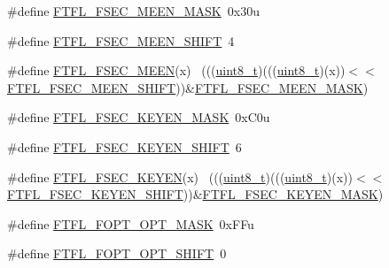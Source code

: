 \begin{DoxyCompactItemize}
\item 
\#define \hyperlink{group___f_t_f_l___register___masks_ga69ec5c88469db83b68d6984b293073a4}{F\+T\+F\+L\+\_\+\+F\+S\+E\+C\+\_\+\+M\+E\+E\+N\+\_\+\+M\+A\+SK}~0x30u
\item 
\#define \hyperlink{group___f_t_f_l___register___masks_ga52f5037890e8b5415825336203a71000}{F\+T\+F\+L\+\_\+\+F\+S\+E\+C\+\_\+\+M\+E\+E\+N\+\_\+\+S\+H\+I\+FT}~4
\item 
\#define \hyperlink{group___f_t_f_l___register___masks_ga69aa03e33f6e979e80bbc0bcd958f306}{F\+T\+F\+L\+\_\+\+F\+S\+E\+C\+\_\+\+M\+E\+EN}(x)                                            ~(((\hyperlink{_p_e___types_8h_aba7bc1797add20fe3efdf37ced1182c5}{uint8\+\_\+t})(((\hyperlink{_p_e___types_8h_aba7bc1797add20fe3efdf37ced1182c5}{uint8\+\_\+t})(x))$<$$<$\hyperlink{group___f_t_f_l___register___masks_ga52f5037890e8b5415825336203a71000}{F\+T\+F\+L\+\_\+\+F\+S\+E\+C\+\_\+\+M\+E\+E\+N\+\_\+\+S\+H\+I\+FT}))\&\hyperlink{group___f_t_f_l___register___masks_ga69ec5c88469db83b68d6984b293073a4}{F\+T\+F\+L\+\_\+\+F\+S\+E\+C\+\_\+\+M\+E\+E\+N\+\_\+\+M\+A\+SK})
\item 
\#define \hyperlink{group___f_t_f_l___register___masks_gab98903ddeed66e96877b9fa7cd2db5b7}{F\+T\+F\+L\+\_\+\+F\+S\+E\+C\+\_\+\+K\+E\+Y\+E\+N\+\_\+\+M\+A\+SK}~0x\+C0u
\item 
\#define \hyperlink{group___f_t_f_l___register___masks_ga78a40af3a63448325e92624831cfa97b}{F\+T\+F\+L\+\_\+\+F\+S\+E\+C\+\_\+\+K\+E\+Y\+E\+N\+\_\+\+S\+H\+I\+FT}~6
\item 
\#define \hyperlink{group___f_t_f_l___register___masks_ga902d25c9bd51f43ed3c845bed8c1ebf6}{F\+T\+F\+L\+\_\+\+F\+S\+E\+C\+\_\+\+K\+E\+Y\+EN}(x)                                          ~(((\hyperlink{_p_e___types_8h_aba7bc1797add20fe3efdf37ced1182c5}{uint8\+\_\+t})(((\hyperlink{_p_e___types_8h_aba7bc1797add20fe3efdf37ced1182c5}{uint8\+\_\+t})(x))$<$$<$\hyperlink{group___f_t_f_l___register___masks_ga78a40af3a63448325e92624831cfa97b}{F\+T\+F\+L\+\_\+\+F\+S\+E\+C\+\_\+\+K\+E\+Y\+E\+N\+\_\+\+S\+H\+I\+FT}))\&\hyperlink{group___f_t_f_l___register___masks_gab98903ddeed66e96877b9fa7cd2db5b7}{F\+T\+F\+L\+\_\+\+F\+S\+E\+C\+\_\+\+K\+E\+Y\+E\+N\+\_\+\+M\+A\+SK})
\item 
\#define \hyperlink{group___f_t_f_l___register___masks_ga680d0e8b99b5bc4b2f8c88141ea38542}{F\+T\+F\+L\+\_\+\+F\+O\+P\+T\+\_\+\+O\+P\+T\+\_\+\+M\+A\+SK}~0x\+F\+Fu
\item 
\#define \hyperlink{group___f_t_f_l___register___masks_gaf9bb9e944f624d01fbeef30f7b164a0b}{F\+T\+F\+L\+\_\+\+F\+O\+P\+T\+\_\+\+O\+P\+T\+\_\+\+S\+H\+I\+FT}~0

\end{DoxyCompactItemize}
